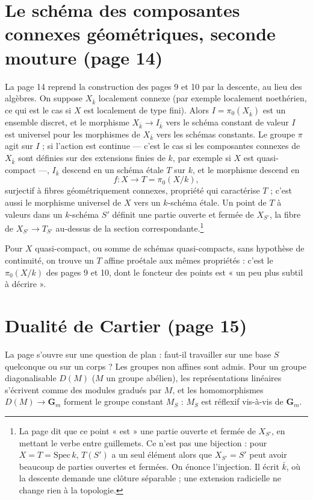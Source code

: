 \documentclass[11pt,a4paper]{article}
\begin{document}
\section*{Le schéma des composantes connexes géométriques, seconde mouture (page 14)}

La page 14 reprend la construction des pages 9 et 10 par la descente, au lieu
des algèbres. On suppose $X_{\bar k}$ localement connexe (par exemple
localement noethérien, ce qui est le cas si $X$ est localement de type fini).
Alors $I = \pi_{0}(X_{\bar k})$ est un ensemble discret, et le morphisme
$X_{\bar k} \to I_{\bar k}$ vers le schéma constant de valeur $I$ est
universel pour les morphismes de $X_{\bar k}$ vers les schémas constants. Le
groupe $\pi$ agit sur $I$ ; si l'action est continue --- c'est le cas si les
composantes connexes de $X_{\bar k}$ sont définies sur des extensions finies
de $k$, par exemple si $X$ est quasi-compact ---, $I_{\bar k}$ descend en un
schéma étale $T$ sur $k$, et le morphisme descend en
\[
  f \colon X \longrightarrow T = \pi_{0}(X/k) ,
\]
surjectif à fibres géométriquement connexes, propriété qui caractérise $T$ ;
c'est aussi le morphisme universel de $X$ vers un $k$-schéma étale. Un point
de $T$ à valeurs dans un $k$-schéma $S'$ définit une partie ouverte et fermée
de $X_{S'}$, la fibre de $X_{S'} \to T_{S'}$ au-dessus de la section
correspondante.\footnote{La page dit que ce point « est » une partie ouverte
et fermée de $X_{S'}$, en mettant le verbe entre guillemets. Ce n'est pas une
bijection : pour $X = T = \mathrm{Spec}\, k$, $T(S')$ a un seul élément alors
que $X_{S'} = S'$ peut avoir beaucoup de parties ouvertes et fermées. On
énonce l'injection. Il écrit $\bar k$, où la descente demande une clôture
séparable ; une extension radicielle ne change rien à la topologie.}

Pour $X$ quasi-compact, ou somme de schémas quasi-compacts, sans hypothèse
de continuité, on trouve un $T$ affine proétale aux mêmes propriétés : c'est
le $\pi_{0}(X/k)$ des pages 9 et 10, dont le foncteur des points est « un peu
plus subtil à décrire ».

\section*{Dualité de Cartier (page 15)}

La page s'ouvre sur une question de plan : faut-il travailler sur une base
$S$ quelconque ou sur un corps ? Les groupes non affines sont admis. Pour un
groupe diagonalisable $D(M)$ ($M$ un groupe abélien), les représentations
linéaires s'écrivent comme des modules gradués par $M$, et les homomorphismes
$D(M) \to \mathbf{G}_{m}$ forment le groupe constant $M_{S}$ : $M_{S}$ est
réflexif vis-à-vis de $\mathbf{G}_{m}$.
\end{document}
